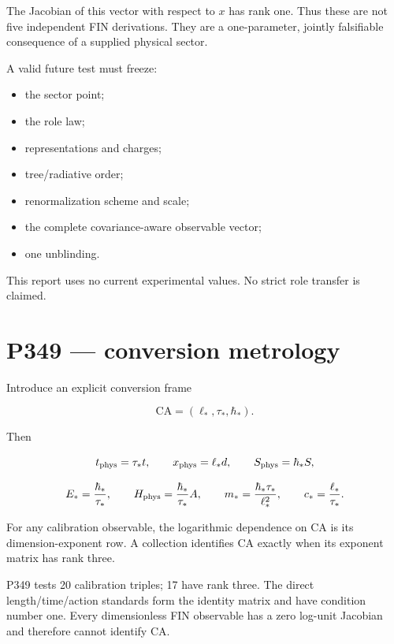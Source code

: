 \documentclass[11pt,a4paper,openany]{report}
\begin{document}
The Jacobian of this vector with respect to \(x\) has rank one. Thus these are not five independent FIN derivations. They are a one-parameter, jointly falsifiable consequence of a supplied physical sector.

A valid future test must freeze:

\begin{itemize}
\item 
the sector point;

\item 
the role law;

\item 
representations and charges;

\item 
tree/\allowbreak{}radiative order;

\item 
renormalization scheme and scale;

\item 
the complete covariance-aware observable vector;

\item 
one unblinding.

\end{itemize}

This report uses no current experimental values. No strict role transfer is claimed.

\chapter{P349 --- conversion metrology}

Introduce an explicit conversion frame

\[
\mathrm{CA}=(\ell_*,\tau_*,\hbar_*).
\]

Then

\[
t_{\rm phys}=\tau_*t,\qquad
x_{\rm phys}=\ell_*d,\qquad
S_{\rm phys}=\hbar_*S,
\]

\[
E_*=\frac{\hbar_*}{\tau_*},\qquad
H_{\rm phys}=\frac{\hbar_*}{\tau_*}A,\qquad
m_*=\frac{\hbar_*\tau_*}{\ell_*^2},\qquad
c_*=\frac{\ell_*}{\tau_*}.
\]

For any calibration observable, the logarithmic dependence on CA is its dimension-exponent row. A collection identifies CA exactly when its exponent matrix has rank three.

P349 tests 20 calibration triples; 17 have rank three. The direct length/\allowbreak{}time/\allowbreak{}action standards form the identity matrix and have condition number one. Every dimensionless FIN observable has a zero log-unit Jacobian and therefore cannot identify CA.
\end{document}
